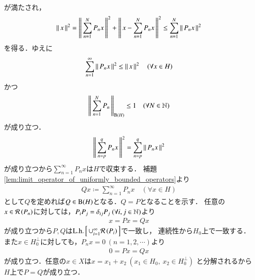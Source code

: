 \begin{prf}
\begin{description}
\begin{align}
				\end{align}
				が満たされ，
				\begin{align}
					\left\|\, x\, \right\|_{}^2 = \left\|\, \sum_{n=1}^{N} P_n x\, \right\|_{}^2 + \left\|\, x - \sum_{n=1}^{N} P_n x\, \right\|_{}^2
					\leq \sum_{n=1}^{N} \left\|\, P_n x\, \right\|_{}^2
				\end{align}
				を得る．ゆえに
				\begin{align}
					\sum_{n=1}^{\infty} \left\|\, P_n x\, \right\|_{}^2 \leq \left\|\, x\, \right\|_{}^2 \quad (\forall x \in H)
				\end{align}
				かつ
				\begin{align}
					\left\|\, \sum_{n=1}^{N} P_n\, \right\|_{\mathrm{B}(H) } \leq 1 \quad (\forall N \in \mathbb{N})
				\end{align}
				が成り立つ．
				\begin{align}
					 \left\|\, \sum_{n=p}^{q} P_n x\, \right\|_{}^2 = \sum_{n=p}^{q} \left\|\, P_n x\, \right\|_{}^2
				\end{align}
				が成り立つから$\sum_{n=1}^{\infty} P_n x$は$H$で収束する．
				補題\ref{lem:limit_operator_of_uniformly_bounded_operators}より
				\begin{align}
					Q x \coloneqq \sum_{n=1}^{\infty} P_n x \quad (\forall x \in H)
				\end{align}
				として$Q$を定めれば$Q \in \mathrm{B}(H) $となる．$Q = P$となることを示す．
				任意の$x \in \mathcal{R}\left(P_n\right) $に対しては，$P_i P_j = \delta_{ij} P_j \ (\forall i,j \in \mathbb{N})$より
				\begin{align}
					x = P x = Q x
				\end{align}
				が成り立つから$P,Q$は$\mathrm{L.h.}\left[\, \cup_{i=1}^{\infty}\mathcal{R}\left(P_i\right)\, \right]$で一致し，
				連続性から$H_0$上で一致する．
				また$x \in H_0^\perp$に対しても，$P_n x = 0\ (n=1,2,\cdots)$より
				\begin{align}
					0 = P x = Q x
				\end{align}
				が成り立つ．任意の$x \in X$は$x = x_1 + x_2\ (x_1 \in H_0,\ x_2 \in H_0^\perp)$
				と分解されるから$H$上で$P = Q$が成り立つ．
				\QED
		\end{description}
	\end{prf}